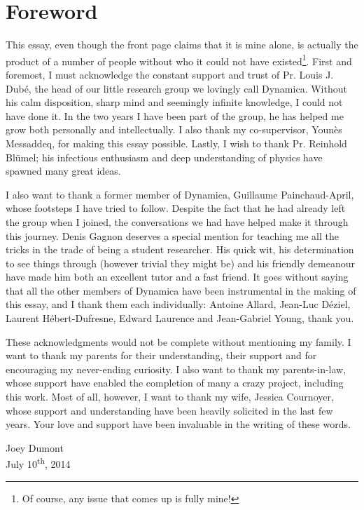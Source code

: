 \chapter*{Foreword}
\renewcommand*{\thefootnote}{\fnsymbol{footnote}}
This essay, even though the front page claims that it is mine alone, 
is actually the product of a number of people without who it
could not have existed\footnote{Of course, any issue that comes up
is fully mine!}. First and foremost, I must acknowledge
the constant support and trust of Pr. Louis J. Dubé, the head
of our little research group we lovingly call Dynamica. Without his calm
disposition, sharp mind and seemingly infinite knowledge, I could not have done it.
In the two years I have been part of the group, he has helped
me grow both personally and intellectually. I also thank my 
co-supervisor, Younès Messaddeq, for making this essay possible.
Lastly, I wish to thank Pr. Reinhold Blümel; his infectious 
enthusiasm and deep understanding of physics have spawned 
many great ideas. 


I also want to thank a former member of Dynamica, 
Guillaume Painchaud-April, whose footsteps I have
tried to follow. Despite the fact that he had already left
the group when I joined, the conversations we had have helped
make it through this journey. Denis Gagnon deserves a special mention
for teaching me all the tricks in the trade of being a student
researcher. His quick wit, his determination to see things through
(however trivial they might be) 
and  his friendly demeanour have made him both an excellent tutor 
and a fast friend. It goes without saying that all the other
members of Dynamica have been instrumental in the making 
of this essay, and I thank them each individually: Antoine 
Allard, Jean-Luc Déziel, Laurent Hébert-Dufresne, Edward
Laurence and Jean-Gabriel Young, thank you. 

These acknowledgments would not be complete without
mentioning my family. I want to thank my parents 
for their understanding, their support and for 
encouraging my never-ending curiosity. I also 
want to thank my parents-in-law, whose support 
have enabled the completion of many a crazy project, 
including this work. Most of all, however, I want to 
thank my wife, Jessica Cournoyer, whose support and 
understanding have been heavily solicited in the last few years. 
Your love and support have been invaluable in the writing of these words. 

\begin{flushright}
Joey Dumont\\
July 10\textsuperscript{th}, 2014
\end{flushright}

\clearpage

